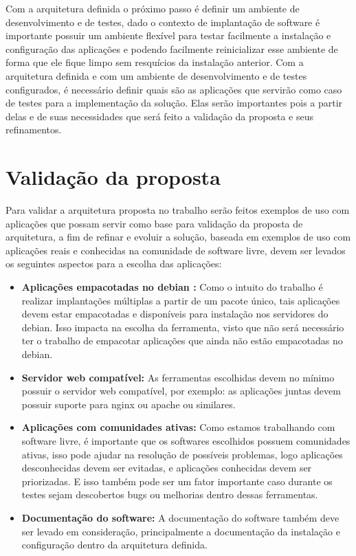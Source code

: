 Com a arquitetura definida o próximo passo é definir um ambiente de desenvolvimento e de
testes, dado o contexto de implantação de software é importante possuir um ambiente flexível para
testar facilmente a instalação e configuração das aplicações e podendo facilmente
reinicializar esse ambiente de forma que ele fique limpo sem resquícios da instalação
anterior. Com a arquitetura definida e com um ambiente de desenvolvimento e de testes configurados, é
necessário definir quais são as aplicações que servirão como caso de testes
para a implementação da solução. Elas serão importantes pois a partir delas
e de suas necessidades que será feito a validação da proposta e seus refinamentos.

\section{Validação da proposta}

Para validar a arquitetura proposta no trabalho serão feitos exemplos de uso com aplicações
que possam servir como base para validação da proposta de arquitetura, a fim de
refinar e evoluir a solução, baseada em exemplos de uso com aplicações reais e conhecidas
na comunidade de software livre, devem ser levados os seguintes aspectos para a
escolha das aplicações:

\begin{itemize}
  \item  \textbf{Aplicações empacotadas no debian :}  Como o intuito do trabalho
  é realizar implantações múltiplas a partir de um pacote único, tais aplicações
  devem estar empacotadas e disponíveis para instalação nos servidores do debian.
  Isso impacta na escolha da ferramenta, visto que não será necessário ter o trabalho
  de empacotar aplicações que ainda não estão empacotadas no debian.
  \item  \textbf{Servidor web compatível:} As ferramentas escolhidas devem no
  mínimo possuir o servidor web compatível, por exemplo: as aplicações juntas
  devem possuir suporte para nginx ou apache ou similares.
  \item  \textbf{Aplicações com comunidades ativas:} Como estamos trabalhando
  com software livre, é importante que os softwares escolhidos possuem comunidades
  ativas, isso pode ajudar na resolução de  possíveis problemas, logo aplicações
  desconhecidas devem ser evitadas, e aplicações conhecidas devem ser priorizadas.
  E isso também pode ser um fator importante caso durante os testes sejam descobertos
  bugs ou melhorias dentro dessas ferramentas.
  \item  \textbf{Documentação do software:} A documentação do software também deve
  ser levado em consideração, principalmente a documentação da instalação e configuração
  dentro da arquitetura definida.
\end{itemize}

